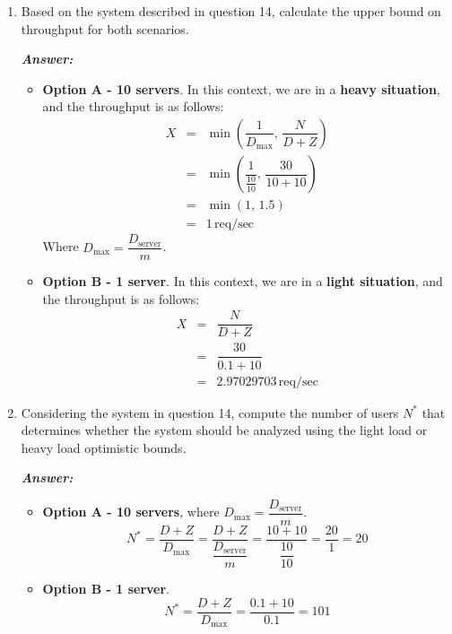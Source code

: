 \begin{enumerate}
    \item Based on the system described in question 14, calculate the upper bound on throughput for both scenarios.

    \textcolor{Green3}{\textbf{\emph{Answer:}}}
    \begin{itemize}
        \item \textbf{Option A - 10 servers}. In this context, we are in a \textbf{heavy situation}, and the throughput is as follows:
        \begin{equation*}
            \begin{array}{rcl}
                X &=& \min\left(\dfrac{1}{D_{\max}}, \, \dfrac{N}{D+Z}\right) \\ [1.5em]
                &=& \min\left(\dfrac{1}{\frac{10}{10}}, \, \dfrac{30}{10+10}\right) \\ [1.5em]
                &=& \min\left(1, \, 1.5\right) \\ [.5em]
                &=& 1 \, \text{req/sec}
            \end{array}
        \end{equation*}
        Where $D_{\max} = \dfrac{D_{\text{server}}}{m}$.

        \item \textbf{Option B - 1 server}. In this context, we are in a \textbf{light situation}, and the throughput is as follows:
        \begin{equation*}
            \begin{array}{rcl}
                X &=& \dfrac{N}{D + Z} \\ [1.5em]
                &=& \dfrac{30}{0.1 + 10} \\ [1.5em]
                &=& 2.97029703 \, \text{req/sec}
            \end{array}
        \end{equation*}
    \end{itemize}

    \item Considering the system in question 14, compute the number of users $N^{*}$ that determines whether the system should be analyzed using the light load or heavy load optimistic bounds.
    
    \textcolor{Green3}{\textbf{\emph{Answer:}}}
    \begin{itemize}
        \item \textbf{Option A - 10 servers}, where $D_{\max} = \dfrac{D_{\text{server}}}{m}$.
        \begin{equation*}
            N^{*} = \dfrac{D + Z}{D_{\max}} = \dfrac{D + Z}{\dfrac{D_{\text{server}}}{m}} = \dfrac{10 + 10}{\dfrac{10}{10}} = \dfrac{20}{1} = 20
        \end{equation*}
        \item \textbf{Option B - 1 server}.
        \begin{equation*}
            N^{*} = \dfrac{D + Z}{D_{\max}} = \dfrac{0.1 + 10}{0.1} = 101
        \end{equation*}
    \end{itemize}
\end{enumerate}

